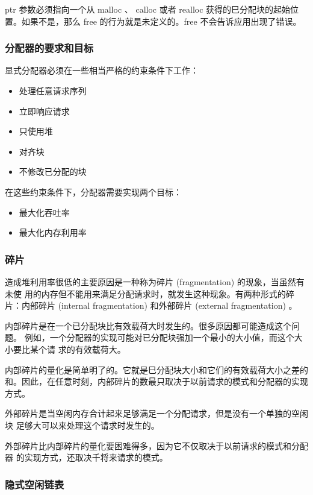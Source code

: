 ptr 参数必须指向一个从 malloc 、 calloc 或者 realloc 获得的巳分配块的起始位
置。如果不是，那么 free 的行为就是未定义的。free 不会告诉应用出现了错误。

\subsubsection{分配器的要求和目标}

显式分配器必须在一些相当严格的约束条件下工作：

\begin{itemize}
    \item 处理任意请求序列
    \item 立即响应请求
    \item 只使用堆
    \item 对齐块
    \item 不修改已分配的块
\end{itemize}

在这些约束条件下，分配器需要实现两个目标：
\begin{itemize}
    \item 最大化吞吐率
    \item 最大化内存利用率
\end{itemize}

\subsubsection{碎片}

造成堆利用率很低的主要原因是一种称为碎片 (fragmentation) 的现象，当虽然有未使
用的内存但不能用来满足分配请求时，就发生这种现象。有两种形式的碎片：内部碎片
(internal fragmentation) 和外部碎片 (external fragmentation) 。

内部碎片是在一个已分配块比有效载荷大时发生的。很多原因都可能造成这个问题。
例如，一个分配器的实现可能对已分配块强加一个最小的大小值，而这个大小要比某个请
求的有效载荷大。

内部碎片的量化是简单明了的。它就是巳分配块大小和它们的有效载荷大小之差的
和。因此，在任意时刻，内部碎片的数最只取决于以前请求的模式和分配器的实现方式。

外部碎片是当空闲内存合计起来足够满足一个分配请求，但是没有一个单独的空闲块
足够大可以来处理这个请求时发生的。

外部碎片比内部碎片的量化要困难得多，因为它不仅取决于以前请求的模式和分配器
的实现方式，还取决千将来请求的模式。

\subsubsection{隐式空闲链表}

